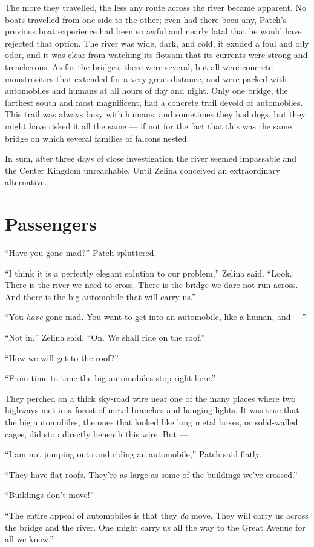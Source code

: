 \documentclass[ebook,oneside,openany,17pt]{memoir}
\renewcommand{\thechapter}{\Roman{chapter}}
\newcounter{sections}
\newcommand{\sections}[1]{%
  \section*{#1}
  \addtocounter{sections}{1}%
  \pdfbookmark[1]{#1}{section.\thechapter.\thesections}}
\begin{document}
The more they travelled, the less any route across the river became
apparent. No boats travelled from one side to the other; even had
there been any, Patch’s previous boat experience had been so awful and
nearly fatal that he would have rejected that option. The river was
wide, dark, and cold, it exuded a foul and oily odor, and it was clear
from watching its flotsam that its currents were strong and
treacherous. As for the bridges, there were several, but all were
concrete monstrosities that extended for a very great distance, and
were packed with automobiles and humans at all hours of day and
night. Only one bridge, the farthest south and most magnificent, had a
concrete trail devoid of automobiles. This trail was always busy with
humans, and sometimes they had dogs, but they might have risked it all
the same — if not for the fact that this was the same bridge on which
several families of falcons nested.

In sum, after three days of close investigation the river seemed
impassable and the Center Kingdom unreachable. Until Zelina conceived
an extraordinary alternative.


\sections{Passengers}

“Have you gone mad?” Patch spluttered.

“I think it is a perfectly elegant solution to our problem,” Zelina
said. “Look. There is the river we need to cross. There is the bridge
we dare not run across. And there is the big automobile that will
carry us.”

“You \emph{have} gone mad. You want to get into an automobile, like
a human, and —”

“Not in,” Zelina said. “On. We shall ride on the roof.”

“How we will get to the roof?”

“From time to time the big automobiles stop right here.”

They perched on a thick sky-road wire near one of the many places
where two highways met in a forest of metal branches and hanging
lights. It was true that the big automobiles, the ones that looked
like long metal boxes, or solid-walled cages, did stop directly
beneath this wire. But —

“I am not jumping onto and riding an automobile,” Patch said flatly.

“They have flat roofs. They’re as large as some of the buildings we’ve
crossed.”

“Buildings don’t move!”

“The entire appeal of automobiles is that they \emph{do} move. They
will carry us across the bridge and the river. One might carry us all
the way to the Great Avenue for all we know.”
\end{document}
